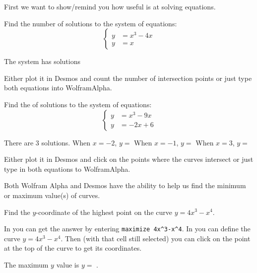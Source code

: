 \documentclass{ximera}
\begin{document}
First we want to show/remind you how useful  is at solving equations.

\begin{question}
Find the number of solutions to the system of equations:
\[
\begin{cases}
y&=x^3-4x\\
y&=x
\end{cases}
\]

The system has  solutions
\begin{hint}
Either plot it in Desmos and count the number of intersection points or just type both equations into WolframAlpha.
\end{hint}

\end{question}



\begin{question}
Find the of solutions to the system of equations:
\[
\begin{cases}
y&=x^3-9x\\
y&=-2x+6
\end{cases}
\]

There are $3$ solutions. 
When $x=-2$, $y=$ 
When $x=-1$, $y=$ 
When $x=3$, $y=$ 

\begin{hint}
Either plot it in Desmos and click on the points where the curves intersect or just type in both equations to WolframAlpha.
\end{hint}

\end{question}

Both Wolfram Alpha and Desmos have the ability to help us find the minimum or maximum value(s) of curves. 

\begin{question}
Find the $y$-coordinate of the highest point on the curve $y=4x^3-x^4$. 

In  you can  get the answer by entering \verb|maximize 4x^3-x^4|. In  you can define the curve $y=4x^3-x^4$. Then (with that cell still selected) you can click on the point at the top of the curve to get its coordinates.


The maximum $y$ value is $y=$ .

\end{question}
\end{document}

